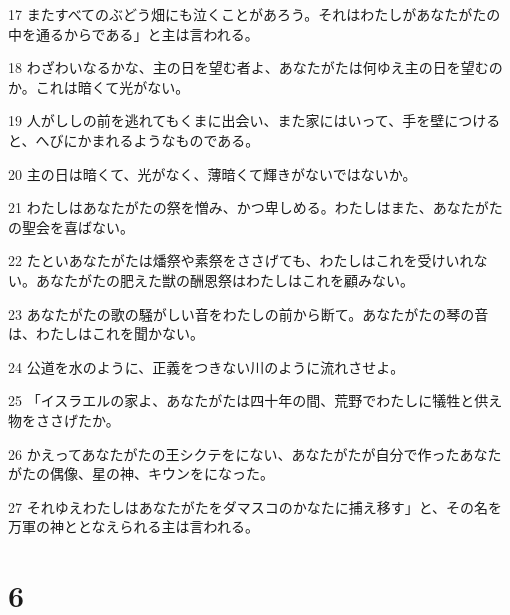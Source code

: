 \par 17 またすべてのぶどう畑にも泣くことがあろう。それはわたしがあなたがたの中を通るからである」と主は言われる。
\par 18 わざわいなるかな、主の日を望む者よ、あなたがたは何ゆえ主の日を望むのか。これは暗くて光がない。
\par 19 人がししの前を逃れてもくまに出会い、また家にはいって、手を壁につけると、へびにかまれるようなものである。
\par 20 主の日は暗くて、光がなく、薄暗くて輝きがないではないか。
\par 21 わたしはあなたがたの祭を憎み、かつ卑しめる。わたしはまた、あなたがたの聖会を喜ばない。
\par 22 たといあなたがたは燔祭や素祭をささげても、わたしはこれを受けいれない。あなたがたの肥えた獣の酬恩祭はわたしはこれを顧みない。
\par 23 あなたがたの歌の騒がしい音をわたしの前から断て。あなたがたの琴の音は、わたしはこれを聞かない。
\par 24 公道を水のように、正義をつきない川のように流れさせよ。
\par 25 「イスラエルの家よ、あなたがたは四十年の間、荒野でわたしに犠牲と供え物をささげたか。
\par 26 かえってあなたがたの王シクテをにない、あなたがたが自分で作ったあなたがたの偶像、星の神、キウンをになった。
\par 27 それゆえわたしはあなたがたをダマスコのかなたに捕え移す」と、その名を万軍の神ととなえられる主は言われる。

\chapter{6}

